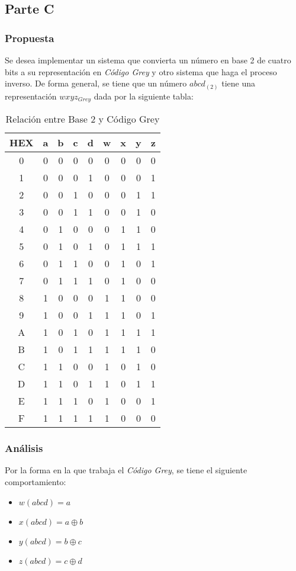 \documentclass[../procedimientos.tex]{subfiles}
\begin{document}
\clearpage
\subsection{Parte C}
\subsubsection{Propuesta}
Se desea implementar un sistema que convierta un número en base 2 de cuatro 
bits a su representación en \textit{Código Grey} y otro sistema que haga el 
proceso inverso. De forma general, se tiene que un número $abcd_{(2)}$ tiene 
una representación $wxyz_{Grey}$ dada por la siguiente tabla:
\begin{table}[H]
  \centering
  \begin{tabular}{c|cccc|cccc}
    \hline
    HEX & a	& b	& c	& d	& w	& x	& y	& z\\
    \hline
    0	& 0	& 0	& 0	& 0	& 0	& 0	& 0	& 0\\
    1	& 0	& 0	& 0	& 1	& 0	& 0	& 0	& 1\\
    2	& 0	& 0	& 1	& 0	& 0	& 0	& 1	& 1\\
    3	& 0	& 0	& 1	& 1	& 0	& 0	& 1	& 0\\
    4	& 0	& 1	& 0	& 0	& 0	& 1	& 1	& 0\\
    5	& 0	& 1	& 0	& 1	& 0	& 1	& 1	& 1\\
    6	& 0	& 1	& 1	& 0	& 0	& 1	& 0	& 1\\
    7	& 0	& 1	& 1	& 1	& 0	& 1	& 0	& 0\\
    8	& 1	& 0	& 0	& 0	& 1	& 1	& 0	& 0\\
    9	& 1	& 0	& 0	& 1	& 1	& 1	& 0	& 1\\
    A	& 1	& 0	& 1	& 0	& 1	& 1	& 1	& 1\\
    B	& 1	& 0	& 1	& 1	& 1	& 1	& 1	& 0\\
    C	& 1	& 1	& 0	& 0	& 1	& 0	& 1	& 0\\
    D	& 1	& 1	& 0	& 1	& 1	& 0	& 1	& 1\\
    E	& 1	& 1	& 1	& 0	& 1	& 0	& 0	& 1\\
    F	& 1	& 1	& 1	& 1	& 1	& 0	& 0	& 0\\
    \hline
  \end{tabular}
  \caption{Relación entre Base 2 y Código Grey}
  \label{tab:bin_to_grey}
\end{table}

\subsubsection{Análisis}
Por la forma en la que trabaja el \textit{Código Grey}, se tiene el siguiente 
comportamiento:
\begin{itemize}
  \item $w(abcd) = a$
  \item $x(abcd) = a \oplus b$
  \item $y(abcd) = b \oplus c$
  \item $z(abcd) = c \oplus d$
\end{itemize}
\end{document}
